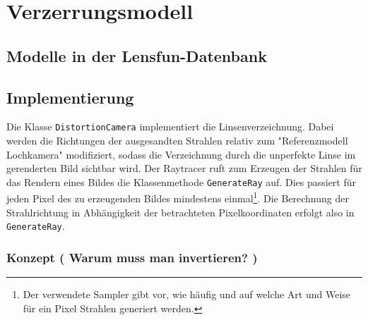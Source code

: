\section{Verzerrungsmodell}

\subsection{Modelle in der Lensfun-Datenbank}

\subsection{Implementierung}

Die Klasse \texttt{DistortionCamera} implementiert die Linsenverzeichnung. Dabei werden die Richtungen der ausgesandten Strahlen relativ zum "Referenzmodell Lochkamera" modifiziert, sodass die Verzeichnung durch die unperfekte Linse im gerenderten Bild sichtbar wird. Der Raytracer ruft zum Erzeugen der Strahlen für das Rendern eines Bildes die Klassenmethode \texttt{GenerateRay} auf. Dies passiert für jeden Pixel des zu erzeugenden Bildes mindestens einmal\footnote{Der verwendete Sampler gibt vor, wie häufig und auf welche Art und Weise für ein Pixel Strahlen generiert werden.}. Die Berechnung der Strahlrichtung in Abhängigkeit der betrachteten Pixelkoordinaten erfolgt also in \texttt{GenerateRay}.

\subsubsection{Konzept ( Warum muss man invertieren? )}

